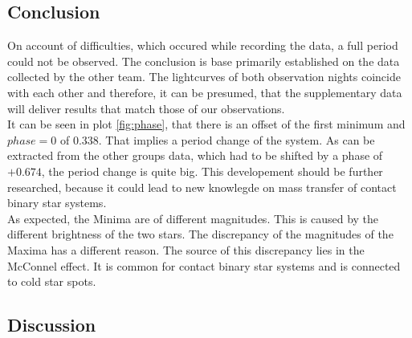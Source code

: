 \subsection{Conclusion}
  \label{sec:fuckoff}
  On account of difficulties, which occured while recording the data, a full period could not
  be observed. The conclusion is base primarily established on the data collected by the other team.
 The lightcurves of both observation nights coincide with each other and therefore, 
  it can be presumed, that the supplementary data will deliver results that match those of our 
  observations.\\
  \noindent It can be seen in plot \ref{fig:phase}, that there is an offset of the first minimum 
  and $phase = 0$ of $ 0.338$. That implies a period change of the system. As can be extracted from
  the other groups data, which had to be shifted by a phase of 
  $+0.674$, the period change is quite big. This developement should be 
  further researched, because it could lead to new knowlegde on mass transfer of contact binary
  star systems.\\
  \noindent As expected, the Minima are of different magnitudes. This is caused by the different brightness
  of the two stars. The discrepancy of the magnitudes of the Maxima has a different reason. The source 
  of this discrepancy lies in the McConnel effect. It is common for contact binary star systems 
  and is connected to cold star spots.

\subsection{Discussion}
  \label{sec:orange}
